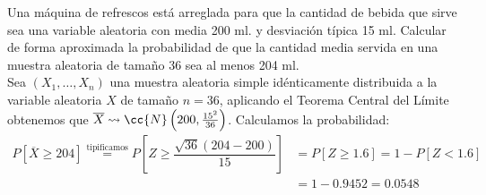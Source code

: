 \begin{ejercicio}
    Una máquina de refrescos está arreglada para que la cantidad de bebida que sirve sea una variable aleatoria con media 200 ml. y desviación típica 15 ml. Calcular de forma aproximada la probabilidad de que la cantidad media servida en una muestra aleatoria de tamaño 36 sea al menos 204 ml.\\

    \noindent
    Sea $(X_1, \ldots, X_n)$ una muestra aleatoria simple idénticamente distribuida a la variable aleatoria $X$ de tamaño $n=36$, aplicando el Teorema Central del Límite obtenemos que $\overline{X}\rightsquigarrow\cc{N}\left(200, \frac{15^2}{36}\right)$. Calculamos la probabilidad:
    \begin{align*}
        P[\overline{X}\geq 204] \stackrel{\text{tipificamos}}{=} P \left[Z \geq \dfrac{\sqrt{36}(204-200)}{15}\right] &= P[Z\geq 1.6] = 1 - P[Z< 1.6] \\
                                                                                                                      &= 1 - 0.9452 = 0.0548
    \end{align*}
\end{ejercicio}
